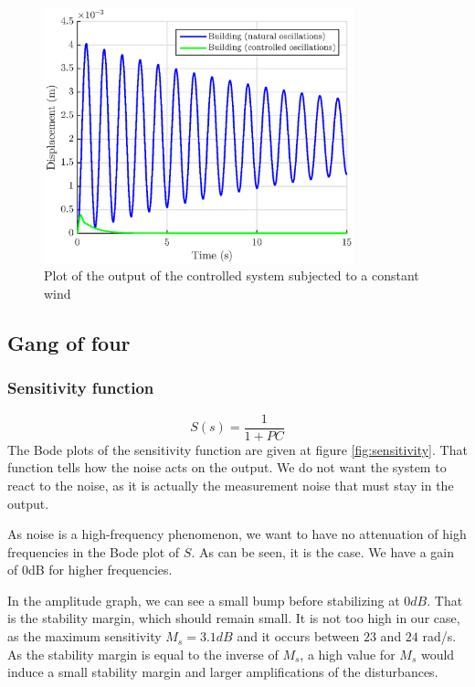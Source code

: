 \begin{figure}[H]
    \centering
    \includegraphics[width=0.8\textwidth]{resources/eps/4-Val/cst_building.eps}
    \caption{Plot of the output of the controlled system subjected to a constant wind}
    \label{fig:output2}
\end{figure}

\subsection{Gang of four}
\subsubsection{Sensitivity function}
$$
S(s) = \dfrac{1}{1 + PC}
$$
The Bode plots of the sensitivity function are given at figure \ref{fig:sensitivity}. That function tells how the noise acts on the output. We do not want the system to react to the noise, as it is actually the measurement noise that must stay in the output.\par
As noise is a high-frequency phenomenon, we want to have no attenuation of high frequencies in the Bode plot of $S$. As can be seen, it is the case. We have a gain of $0$dB for higher frequencies.\par
In the amplitude graph, we can see a small bump before stabilizing at $0dB$. That is the stability margin, which should remain small. It is not too high in our case, as the maximum sensitivity $M_s = 3.1dB$ and it occurs between $23$ and $24$ rad/s. As the stability margin is equal to the inverse of $M_s$, a high value for $M_s$ would induce a small stability margin and larger amplifications of the disturbances.\newline
